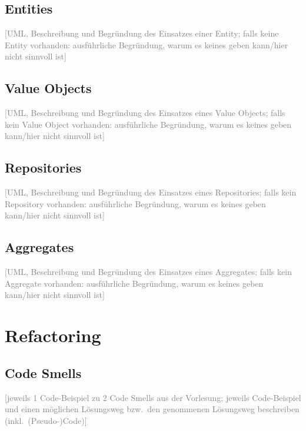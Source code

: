 \documentclass[a4paper,12pt]{article}
\newcommand{\placeholder}[1]{\textcolor{gray}{[#1]}}
\begin{document}
\bigskip

\subsection*{Entities}

\placeholder{UML, Beschreibung und Begründung des Einsatzes einer Entity; falls keine Entity
    vorhanden: ausführliche Begründung, warum es keines geben kann/hier nicht sinnvoll ist}

\subsection*{Value Objects}

\placeholder{UML, Beschreibung und Begründung des Einsatzes eines Value Objects; falls kein
    Value Object vorhanden: ausführliche Begründung, warum es keines geben kann/hier nicht sinnvoll ist}

\subsection*{Repositories}

\placeholder{UML, Beschreibung und Begründung des Einsatzes eines Repositories; falls kein
    Repository vorhanden: ausführliche Begründung, warum es keines geben kann/hier nicht sinnvoll ist}

\subsection*{Aggregates}

\placeholder{UML, Beschreibung und Begründung des Einsatzes eines Aggregates; falls kein
    Aggregate vorhanden: ausführliche Begründung, warum es keines geben kann/hier nicht sinnvoll ist}

\section{Refactoring}

\subsection*{Code Smells}

\placeholder{jeweils 1 Code-Beispiel zu 2 Code Smells aus der Vorlesung; jeweils Code-Beispiel
    und einen möglichen Lösungsweg bzw.\ den genommenen Lösungsweg beschreiben (inkl.\ (Pseudo-)Code)}
\end{document}
